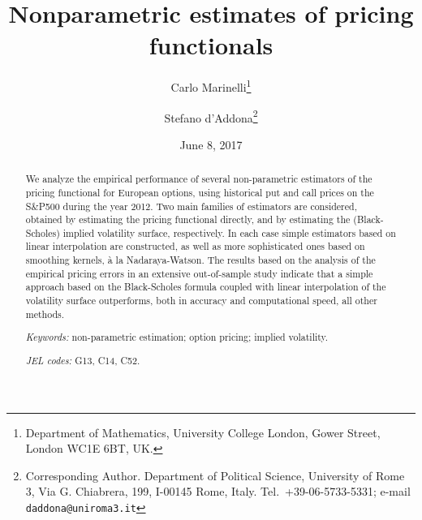 \documentclass[11pt]{article}
\title{Nonparametric estimates of pricing functionals}
\author{Carlo Marinelli\thanks{Department of Mathematics, University
    College London, Gower Street, London WC1E 6BT, UK.} \and Stefano
  d'Addona\thanks{Corresponding Author. Department of Political
    Science, University of Rome 3, Via G. Chiabrera, 199, I-00145
    Rome, Italy. Tel.~+39-06-5733-5331; e-mail
    \texttt{daddona@uniroma3.it}}}
\date{June 8, 2017}
\theoremstyle{remark}
\begin{document}
\maketitle

\begin{abstract}
  We analyze the empirical performance of several non-parametric
  estimators of the pricing functional for European options, using
  historical put and call prices on the S\&P500 during the year
  2012. Two main families of estimators are considered, obtained by
  estimating the pricing functional directly, and by estimating the
  (Black-Scholes) implied volatility surface, respectively. In each
  case simple estimators based on linear interpolation are
  constructed, as well as more sophisticated ones based on smoothing
  kernels, \`a la Nadaraya-Watson. The results based on the analysis
  of the empirical pricing errors in an extensive out-of-sample study
  indicate that a simple approach based on the Black-Scholes formula
  coupled with linear interpolation of the volatility surface
  outperforms, both in accuracy and computational speed, all other
  methods.

\medskip

\noindent \textit{Keywords:} non-parametric estimation; option
pricing; implied volatility.

\medskip

\noindent \textit{JEL codes:} G13, C14, C52.
\end{abstract}
\end{document}
